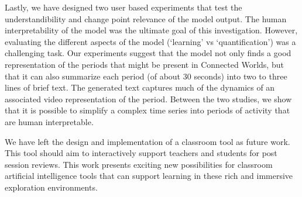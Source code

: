 Lastly, we have designed two user based experiments that test the understandibility and change point relevance of the model output. The human interpretability of the model was the ultimate goal of this investigation. However, evaluating the different aspects of the model (`learning' vs `quantification') was a challenging task. Our experiments suggest that the model not only finds a good representation of the periods that might be present in Connected Worlds, but that it can also summarize each period (of about 30 seconds) into two to three lines of brief text. The generated text captures much of the dynamics of an associated video representation of the period. Between the two studies, we show that it is possible to simplify a complex time series into periods of activity that are human interpretable.

We have left the design and implementation of a classroom tool as future work. This tool should aim to interactively support teachers and students for post session reviews. This work presents exciting new possibilities for classroom artificial intelligence tools that can support learning in these rich and immersive exploration environments.
